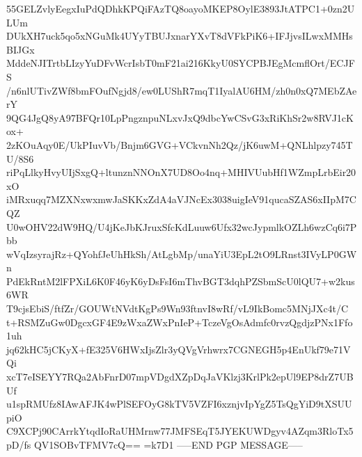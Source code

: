 55GELZvlyEegxIuPdQDhkKPQiFAzTQ8oayoMKEP8OylE3893JtATPC1+0zn2ULUm
DUkXH7uck5qo5xNGuMk4UYyTBUJxnarYXvT8dVFkPiK6+IFJjvsILwxMMHsBIJGx
MddeNJITrtbLIzyYuDFvWcrIsbT0mF21ai216KkyU0SYCPBJEgMcmflOrt/ECJFS
/n6nlUTivZWf8bmFOufNgjd8/ew0LUShR7mqT1IyalAU6HM/zh0n0xQ7MEbZAerY
9QG4JgQ8yA97BFQr10LpPngznpuNLxvJxQ9dbcYwCSvG3xRiKhSr2w8RVJ1cKox+
2zKOuAqy0E/UkPIuvVb/Bnjm6GVG+VCkvnNh2Qz/jK6uwM+QNLhlpzy745TU/8S6
riPqLlkyHvyUIjSxgQ+ltunznNNOnX7UD8Oo4nq+MHIVUubHf1WZmpLrbEir20xO
iMRxuqq7MZXNxwxmwJaSKKxZdA4aVJNcEx3038uigIeV91qucaSZAS6xIIpM7CQZ
U0wOHV22dW9HQ/U4jKeJbKJruxSfcKdLuuw6Ufx32wcJypmlkOZLh6wzCq6i7Pbb
wVqIzsyrajRz+QYohfJeUhHkSh/AtLgbMp/unaYiU3EpL2tO9LRnst3IVyLP0GWn
PdEkRntM2lFPXiL6K0F46yK6yDsFsI6mThvBGT3dqhPZSbmScU0lQU7+w2kus6WR
T9cjsEbiS/ftfZr/GOUWtNVdtKgPs9Wn93ftnvI8wRf/vL9IkBomc5MNjJXc4t/C
t+RSMZuGw0DgcxGF4E9zWxaZWxPnIeP+TczeVgOsAdmfc0rvzQgdjzPNx1Ffo1uh
jq62kHC5jCKyX+fE325V6HWxIjsZlr3yQVgVrhwrx7CGNEGH5p4EnUkf79e71VQi
xcT7eISEYY7RQa2AbFnrD07mpVDgdXZpDqJaVKlzj3KrlPk2epUl9EP8drZ7UBUf
u1spRMUfz8IAwAFJK4wPlSEFOyG8kTV5VZFI6xznjvIpYgZ5TsQgYiD9tXSUUpiO
C9XCPj90CArrkYtqdIoRaUHMrnw77JMFSEqT5JYEKUWDgyv4AZqm3RloTx5pD/fs
QV1SOBvTFMV7cQ==
=k7D1
-----END PGP MESSAGE-----
